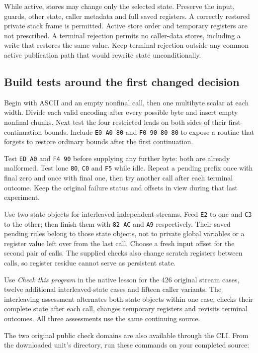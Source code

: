 While active, stores may change only the selected state. Preserve the input,
guards, other state, caller metadata and full saved registers. A correctly restored
private stack frame is permitted. Active store order and temporary registers are
not prescribed. A terminal rejection permits no caller-data stores, including a
write that restores the same value. Keep terminal rejection outside any common
active publication path that would rewrite state unconditionally.

\subsection*{Build tests around the first changed decision}

Begin with ASCII and an empty nonfinal call, then one multibyte scalar at each
width. Divide each valid encoding after every possible byte and insert empty
nonfinal chunks. Next test the four restricted leads on both sides of their first-
continuation bounds. Include \texttt{E0 A0 80} and \texttt{F0 90 80 80} to expose
a routine that forgets to restore ordinary bounds after the first continuation.

Test \texttt{ED A0} and \texttt{F4 90} before supplying any further byte: both
are already malformed. Test lone \texttt{80}, \texttt{C0} and \texttt{F5} while
idle. Repeat a pending prefix once with final zero and once with final one, then
try another call after each terminal outcome. Keep the original failure status
and offsets in view during that last experiment.

Use two state objects for interleaved independent streams. Feed \texttt{E2} to
one and \texttt{C3} to the other; then finish them with \texttt{82 AC} and
\texttt{A9} respectively. Their saved pending rules belong to those state objects,
not to private global variables or a register value left over from the last call.
Choose a fresh input offset for the second pair of calls. The supplied checks also
change scratch registers between calls, so register residue cannot serve as
persistent state.

Use \emph{Check this program} in the native lesson for the 426 original stream
cases, twelve additional interleaved-state cases and fifteen caller variants.
The interleaving assessment alternates both state objects within one case, checks
their complete state after each call, changes temporary registers and revisits
terminal outcomes. All three assessments use the same continuing source.

The two original public check domains are also available through the CLI. From
the downloaded unit's directory, run these commands on your completed source:


